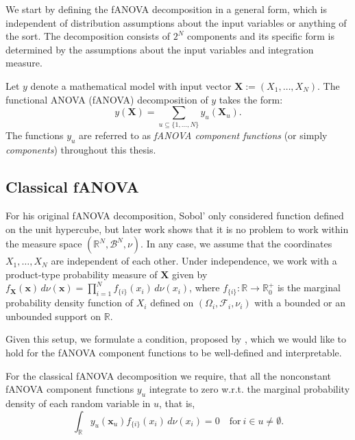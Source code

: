 We start by defining the fANOVA decomposition in a general form, which is independent of distribution assumptions about the input variables or anything of the sort. The decomposition consists of $2^N$ components and its specific form is determined by the assumptions about the input variables and integration measure.

\begin{definition}\label{def:fanova_decomposition}
Let $y$ denote a mathematical model with input vector $\boldsymbol{X} := (X_1, \dots, X_N)$. 
The functional ANOVA (fANOVA) decomposition of $y$ takes the form:
\begin{equation}
    y(\boldsymbol{X}) = \sum_{u \subseteq \{1, \dots, N\}} y_{u}(\boldsymbol{X}_u).
\end{equation}
The functions $y_u$ are referred to as \emph{fANOVA component functions} 
(or simply \emph{components}) throughout this thesis.
\end{definition}

\subsection{Classical fANOVA}
For his original fANOVA decomposition, Sobol' only considered function defined on the unit hypercube, but later work shows that it is no problem to work within the measure space $(\mathbb{R}^N, \mathcal{B}^N, \nu)$.
In any case, we assume that the coordinates $X_1, \dots , X_N$ are independent of each other.
Under independence, we work with a product-type probability measure of $\boldsymbol{X}$ given by \(f_{\boldsymbol{X}}(\boldsymbol{x}) \, d\nu(\boldsymbol{x}) = \prod_{i=1}^{N} f_{\{i\}}(x_i) \, d\nu(x_i)\), where \(f_{\{i\}}: \mathbb{R} \rightarrow \mathbb{R}_{0}^{+}\) is the marginal probability density function of \(X_i\) defined on $(\Omega_i, \mathcal{F}_i, \nu_i)$ with a bounded or an unbounded support on $\mathbb{R}$.

Given this setup, we formulate a condition, proposed by \cite{rahman2014}, which we would like to hold for the fANOVA component functions to be well-defined and interpretable.
\begin{condition}\label{cond:strong_annihilating_conditions}
    For the classical fANOVA decomposition we require, that all the nonconstant fANOVA component functions $y_u$ integrate to zero w.r.t. the marginal probability density of each random variable in $u$, that is,
\begin{equation}
    \int_{\mathbb{R}} y_u(\boldsymbol{x}_u) f_{\{i\}}(x_i) \, d\nu(x_i) = 0 \quad \text{for} \ i \in u \neq \emptyset.
\end{equation}
\end{condition}

